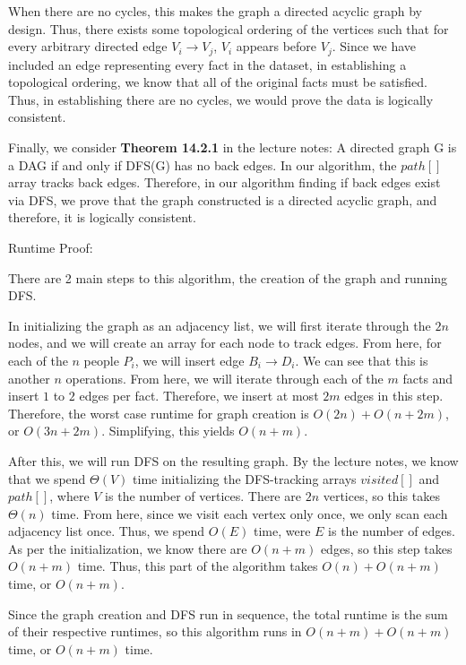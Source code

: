 \documentclass[11pt]{article}
\begin{document}
When there are no cycles, this makes the graph a directed acyclic graph by design. Thus, there exists some topological ordering of the vertices 
such that for every arbitrary directed edge $V_i \rightarrow V_j$, $V_i$ appears before $V_j$. Since we have included an edge representing every fact 
in the dataset, in establishing a topological ordering, we know that all of the original facts must be satisfied. Thus, in establishing there are 
no cycles, we would prove the data is logically consistent.

Finally, we consider \textbf{Theorem 14.2.1} in the lecture notes: A directed graph G is a DAG if and only if DFS(G) has no back edges. 
In our algorithm, the $path[]$ array tracks back edges. Therefore, in our algorithm finding if back edges exist via DFS, 
we prove that the graph constructed is a directed acyclic graph, and therefore, it is logically consistent.

\bigbreak

Runtime Proof:

There are 2 main steps to this algorithm, the creation of the graph and running DFS.

In initializing the graph as an adjacency list, we will first iterate through the $2n$ nodes, and we will create an array for each node to track edges. 
From here, for each of the $n$ people $P_i$, we will insert edge $B_i \rightarrow D_i$. We can see that this is another $n$ operations. 
From here, we will iterate through each of the $m$ facts and insert $1$ to $2$ edges per fact. Therefore, we insert at most $2m$ edges in this step. 
Therefore, the worst case runtime for graph creation is $O(2n) + O(n + 2m)$, or $O(3n + 2m)$. Simplifying, this yields $O(n + m)$. 

After this, we will run DFS on the resulting graph. By the lecture notes, we know that we spend $\Theta(V)$ time initializing the DFS-tracking arrays 
$visited[]$ and $path[]$, where $V$ is the number of vertices. There are $2n$ vertices, so this takes $\Theta(n)$ time. 
From here, since we visit each vertex only once, we only scan each adjacency list once. Thus, we spend $O(E)$ time, were $E$ is the number of edges. 
As per the initialization, we know there are $O(n + m)$ edges, so this step takes $O(n + m)$ time. Thus, this part of the algorithm takes 
$O(n ) + O(n + m)$ time, or $O(n + m)$.

Since the graph creation and DFS run in sequence, the total runtime is the sum of their respective runtimes, so this algorithm runs in 
$O(n + m) + O(n + m)$ time, or $O(n + m)$ time.
\end{document}
